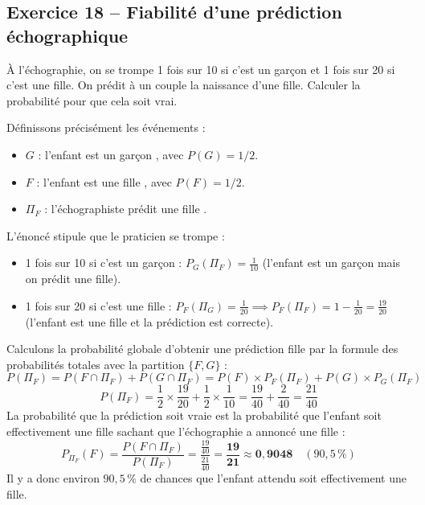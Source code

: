 \documentclass[11pt,a4paper]{article}
\begin{document}
\vspace{0.3cm}

\subsection*{Exercice 18 -- Fiabilité d'une prédiction échographique}

À l'échographie, on se trompe 1 fois sur 10 si c'est un garçon et 1 fois sur 20 si c'est une fille. On prédit à un couple la naissance d'une fille.
Calculer la probabilité pour que cela soit vrai.

\begin{correctionbox}
Définissons précisément les événements :
\begin{itemize}[label=$\bullet$]
    \item $G$ : \og l'enfant est un garçon \fg{}, avec $P(G) = 1/2$.
    \item $F$ : \og l'enfant est une fille \fg{}, avec $P(F) = 1/2$.
    \item $\Pi_F$ : \og l'échographiste prédit une fille \fg{}.
\end{itemize}
L'énoncé stipule que le praticien se trompe :
\begin{itemize}[label=$\bullet$]
    \item 1 fois sur 10 si c'est un garçon : $P_G(\Pi_F) = \frac{1}{10}$ (l'enfant est un garçon mais on prédit une fille).
    \item 1 fois sur 20 si c'est une fille : $P_F(\Pi_G) = \frac{1}{20} \implies P_F(\Pi_F) = 1 - \frac{1}{20} = \frac{19}{20}$ (l'enfant est une fille et la prédiction est correcte).
\end{itemize}

Calculons la probabilité globale d'obtenir une prédiction \og fille \fg{} par la formule des probabilités totales avec la partition $\{F, G\}$ :
\[
P(\Pi_F) = P(F \cap \Pi_F) + P(G \cap \Pi_F) = P(F) \times P_F(\Pi_F) + P(G) \times P_G(\Pi_F)
\]
\[
P(\Pi_F) = \frac{1}{2} \times \frac{19}{20} + \frac{1}{2} \times \frac{1}{10} = \frac{19}{40} + \frac{2}{40} = \frac{21}{40}
\]
La probabilité que la prédiction soit vraie est la probabilité que l'enfant soit effectivement une fille sachant que l'échographie a annoncé une fille :
\[
P_{\Pi_F}(F) = \frac{P(F \cap \Pi_F)}{P(\Pi_F)} = \frac{\frac{19}{40}}{\frac{21}{40}} = \mathbf{\frac{19}{21}} \approx \mathbf{0{,}9048} \quad (90{,}5\,\%)
\]
Il y a donc environ $90{,}5\,\%$ de chances que l'enfant attendu soit effectivement une fille.
\end{correctionbox}
\end{document}
